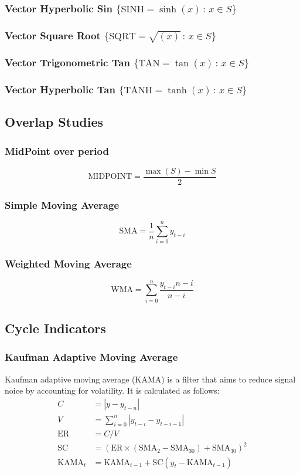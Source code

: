 \subsubsection{Vector Hyperbolic Sin $\{\text{SINH}=\sinh(x) \,:\, x \in S \}$}
\subsubsection{Vector Square Root $\{\text{SQRT}=\sqrt{(x)} \,:\, x \in S \}$}
\subsubsection{Vector Trigonometric Tan $\{\text{TAN}=\tan(x) \,:\, x \in S \}$}
\subsubsection{Vector Hyperbolic Tan $\{\text{TANH}=\tanh(x) \,:\, x \in S \}$}
\hspace{1cm}
\subsection{Overlap Studies}
\subsubsection{MidPoint over period}
    \[\text{MIDPOINT} = \frac{\max(S)-\min{S}}{2}\]
\subsubsection{Simple Moving Average}
    \[\text{SMA}= \frac{1}{n} \sum_{i=0}^{n} y_{t-i} \]
\subsubsection{Weighted Moving Average}
    \[ \text{WMA} = \sum_{i=0}^{n}\frac{y_{t-i}n-i}{n-i} \]
\hspace{1cm}
\subsection{Cycle Indicators}
\subsubsection{Kaufman Adaptive Moving Average}
Kaufman adaptive moving average (KAMA) is a filter that aims to reduce signal noice by accounting for volatility. It is calculated as follows:
    \begin{align*}
        C &= | y - y_{t-n} | \\
        V &= \sum_{i=0}^{n}|y_{t-i}-y_{t-i-1}| \\
        \text{ER} &= C / V \\
        \text{SC} &= (\text{ER}\times(\text{SMA}_{2}-\text{SMA}_{30}) + \text{SMA}_{30})^2 \\
        \text{KAMA}_{t} &= \text{KAMA}_{t-1} + \text{SC} (y_t - \text{KAMA}_{t-1})
    \end{align*}

